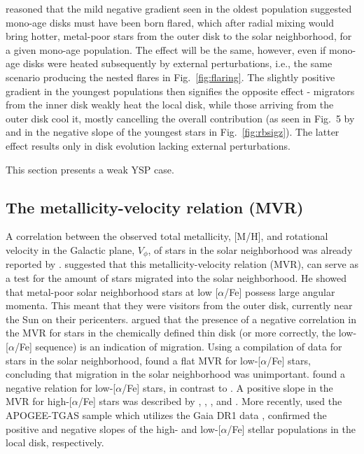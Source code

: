 \documentclass[usenatbib]{mnras}
\begin{document}
\cite{ciuca18} reasoned that the mild negative gradient seen in the oldest population suggested mono-age disks must have been born flared, which after radial mixing would bring hotter, metal-poor stars from the outer disk to the solar neighborhood, for a given mono-age population. The effect will be the same, however, even if mono-age disks were heated subsequently by external perturbations, i.e., the same scenario producing the nested flares in Fig.~\ref{fig:flaring}. The slightly positive gradient in the youngest populations then signifies the opposite effect - migrators from the inner disk weakly heat the local disk, while those arriving from the outer disk cool it, mostly cancelling the overall contribution (as seen in Fig.~5 by \citealt{minchev12b} and in the negative slope of the youngest stars in Fig.~\ref{fig:rbsigz}). The latter effect results only in disk evolution lacking external perturbations. 

This section presents a weak YSP case.


\subsection{The metallicity-velocity relation (MVR)}
\label{sec:mvr}


A correlation between the observed total metallicity, [M/H], and rotational velocity in the Galactic plane, $V_\phi$, of stars in the solar neighborhood was already reported by \cite{carney90}. \cite{haywood08} suggested that this metallicity-velocity relation (MVR), can serve as a test for the amount of stars migrated into the solar neighborhood. He showed that metal-poor solar neighborhood stars at low [$\alpha$/Fe] possess large angular momenta. This meant that they were visitors from the outer disk, currently near the Sun on their pericenters. \cite{schonrich09a} argued that the presence of a negative correlation in the MVR for stars in the chemically defined thin disk (or more correctly, the low-[$\alpha$/Fe] sequence) is an indication of migration. Using a compilation of data for stars in the solar neighborhood, \cite{navarro11} found a flat MVR for low-[$\alpha$/Fe] stars, concluding that migration in the solar neighborhood was unimportant. \cite{lee11} found a negative relation for low-[$\alpha$/Fe] stars, in contrast to \cite{navarro11}. A positive slope in the MVR for high-[$\alpha$/Fe] stars was described by \cite{spagna10}, \cite{lee11}, \cite{kordopatis11}, and \cite{adibekyan13}. More recently, \cite{allende-prieto16} used the APOGEE-TGAS sample which utilizes the Gaia DR1 data \citep{gaia16}, confirmed the positive and negative slopes of the high- and low-[$\alpha$/Fe] stellar populations in the local disk, respectively. 
\end{document}
